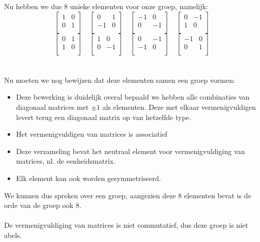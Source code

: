 \documentclass[11pt,a4paper,titlepage]{article}
\begin{document}
Nu hebben we dus 8 unieke elementen voor onze groep, namelijk:
\[
\begin{bmatrix}
    	1 & 0 \\
	0 & 1 \\
\end{bmatrix}
\quad
\begin{bmatrix}
    	0 & 1 \\
	-1 & 0 \\
\end{bmatrix}
\quad
\begin{bmatrix}
    	-1 & 0 \\
	0 & -1 \\
\end{bmatrix}
\quad
\begin{bmatrix}
    	0 & -1 \\
	1 & 0 \\
\end{bmatrix}
\]
\[
\begin{bmatrix}
    	0 & 1 \\
	1 & 0 \\
\end{bmatrix}
\quad
\begin{bmatrix}
    	1 & 0 \\
	0 & -1 \\
\end{bmatrix}
\quad
\begin{bmatrix}
    	0 & -1 \\
	-1 & 0 \\
\end{bmatrix}
\quad
\begin{bmatrix}
    	-1 & 0 \\
	0 & 1 \\
\end{bmatrix}
\]
\\ \\Nu moeten we nog bewijzen dat deze elementen samen een groep vormen:
\begin{itemize}
	\item Deze bewerking is duidelijk overal bepaald we hebben alle combinaties van diagonaal matrices met $\pm 1$ als elementen. Deze met elkaar vermenigvuldigen levert terug een diagonaal matrix op van hetzelfde type.
	\item Het vermenigvuldigen van matrices is associatief
	\item Deze verzameling bevat het neutraal element voor vermenigvuldiging van matrices, nl. de eenheidsmatrix.
	\item Elk element kan ook worden gesymmetriseerd.
\end{itemize}
We kunnen dus spreken over een groep, aangezien deze 8 elementen bevat is de orde van de groep ook 8.\\ \\
De vermenigvuldiging van matrices is niet commutatief, dus deze groep is niet abels.
\end{document}
